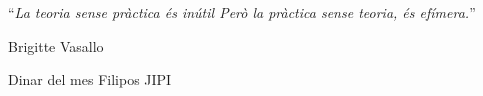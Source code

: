 \documentclass[
11pt, %
english, %
onehalfspacing %
]{MastersDoctoralThesis} %
\begin{document}
\noindent\enquote{\itshape La teoria sense pràctica és inútil
Però la pràctica sense teoria, és efímera.}\bigbreak

\hfill Brigitte Vasallo


\begin{abstract}
\addchaptertocentry{\abstractname} %

%

\end{abstract}


\begin{resum}
\addchaptertocentry{\resumname} %

%

\end{resum}


\begin{acknowledgements}
\addchaptertocentry{\acknowledgementname} %
Dinar del mes
Filipos
JIPI

%

\end{acknowledgements}


\tableofcontents %

\listoffigures %
\end{document}
